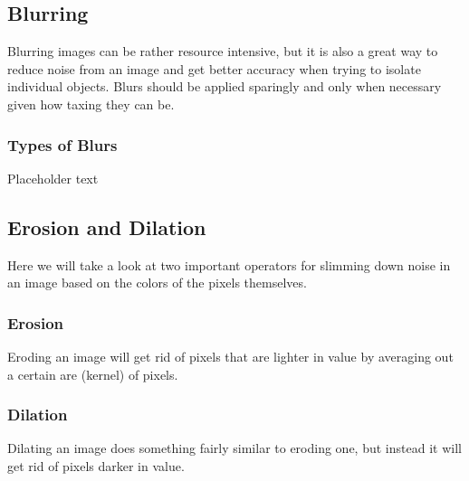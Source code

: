 \documentclass[12pt]{article}
\begin{document}
\subsection*{Blurring}
Blurring images can be rather resource intensive, but it is also a great way to reduce noise from an image and get better accuracy when trying to isolate individual objects. Blurs should be applied sparingly and only when necessary given how taxing they can be.
\subsubsection*{Types of Blurs}
Placeholder text
\subsection*{Erosion and Dilation}
Here we will take a look at two important operators for slimming down noise in an image based on the colors of the pixels themselves.
\subsubsection*{Erosion}
Eroding an image will get rid of pixels that are lighter in value by averaging out a certain are (kernel) of pixels.
\subsubsection*{Dilation}
Dilating an image does something fairly similar to eroding one, but instead it will get rid of pixels darker in value.
\end{document}
